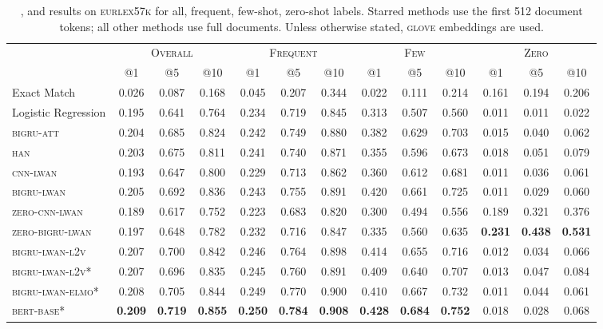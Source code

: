 \documentclass[11pt,a4paper]{article}
\newcommand{\bigruatt}{\textsc{bigru-att}\xspace}
\newcommand{\han}{\textsc{han}\xspace}
\newcommand{\lwancnn}{\textsc{cnn-lwan}\xspace}
\newcommand{\zlwancnn}{\textsc{zero-cnn-lwan}\xspace}
\newcommand{\lwangru}{\textsc{bigru-lwan}\xspace}
\newcommand{\lwangrulv}{\textsc{bigru-lwan-l2v}}
\newcommand{\lwangruelmo}{\textsc{bigru-lwan-elmo}}
\newcommand{\zlwangru}{\textsc{zero-bigru-lwan}\xspace}
\newcommand{\glove}{\textsc{glove}\xspace}
\newcommand{\bertbase}{\textsc{bert-base}\xspace}
\newcommand{\newdata}{\textsc{eurlex57k}\xspace}
\begin{document}
\begin{table*}[h!]
\centering
{
\footnotesize\addtolength{\tabcolsep}{-2pt}
\begin{tabular}{lcccccccccccc}
  \hline
  & \multicolumn{3}{c}{\textsc{Overall}} & \multicolumn{3}{c}{\textsc{Frequent}} & \multicolumn{3}{c}{\textsc{Few}} & \multicolumn{3}{c}{\textsc{Zero}} \\ 
  & @1 & @5 & @10 & @1 & @5 & @10 & @1 & @5 & @10 & @1 & @5 & @10 \\
  \cline{2-13}
  Exact Match & 0.026 & 0.087 & 0.168 & 0.045 & 0.207 & 0.344 & 0.022 & 0.111 & 0.214 & 0.161 & 0.194 & 0.206 \\
  Logistic Regression & 0.195 & 0.641 & 0.764 & 0.234 & 0.719 & 0.845 & 0.313 & 0.507 & 0.560 & 0.011 & 0.011 & 0.022 \\
  \hline
  \bigruatt & 0.204 & 0.685 & 0.824 & 0.242 & 0.749 & 0.880 & 0.382 & 0.629 & 0.703 & 0.015 & 0.040 & 0.062 \\
  \han & 0.203 & 0.675 & 0.811 & 0.241 & 0.740 & 0.871 & 0.355 & 0.596 & 0.673 & 0.018 & 0.051 & 0.079 \\
  \hline
 \lwancnn & 0.193 & 0.647 & 0.800 & 0.229 & 0.713 & 0.862 & 0.360 & 0.612 & 0.681 & 0.011 & 0.036 & 0.061 \\
  \lwangru & 0.205 & 0.692 & 0.836 & 0.243 & 0.755 & 0.891 & 0.420 & 0.661 & 0.725 & 0.011 & 0.029 & 0.060 \\
   \hline
  \zlwancnn & 0.189 & 0.617 & 0.752 & 0.223 & 0.683 & 0.820 & 0.300 & 0.494 & 0.556 & 0.189 & 0.321 & 0.376 \\
  \zlwangru & 0.197 & 0.648 & 0.782 & 0.232 & 0.716 & 0.847 & 0.335 & 0.560 & 0.635 & \textbf{0.231} & \textbf{0.438} & \textbf{0.531} \\
  \hline\hline
   \lwangrulv & 0.207 & 0.700 & 0.842 & 0.246 & 0.764 & 0.898 & 0.414 & 0.655 & 0.716 & 0.012 & 0.034 & 0.066 \\
\hline
\lwangrulv* & 0.207 & 0.696 & 0.835 & 0.245 & 0.760 & 0.891 & 0.409 & 0.640 & 0.707 & 0.013 & 0.047 & 0.084 \\
\lwangruelmo* & 0.208 & 0.705 & 0.844 & 0.249 & 0.770 & 0.900 & 0.410 & 0.667 & 0.732 & 0.011 & 0.044 & 0.061 \\
  \bertbase* & \textbf{0.209} & \textbf{0.719} & \textbf{0.855} & \textbf{0.250} & \textbf{0.784} & \textbf{0.908} & \textbf{0.428} & \textbf{0.684} & \textbf{0.752} & 0.018 & 0.028 & 0.068 \\
  \hline
\end{tabular}
}
\caption{,  and  results on \newdata for all, frequent, few-shot, zero-shot labels. Starred methods use the first 512 document tokens; all other methods use full documents. Unless otherwise stated, \glove embeddings are used.}
\label{tab:rresults}
\end{table*}
\end{document}

